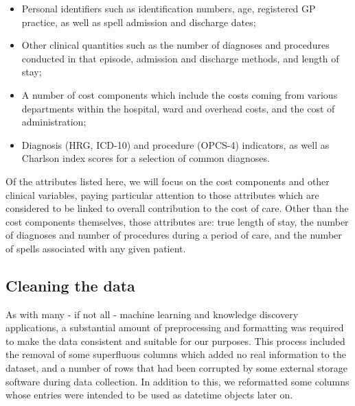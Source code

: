 \begin{itemize}
    \item Personal identifiers such as identification numbers, age, registered
        GP practice, as well as spell admission and discharge dates;
    \item Other clinical quantities such as the number of diagnoses and
        procedures conducted in that episode, admission and discharge methods,
        and length of stay;
    \item A number of cost components which include the costs coming from
        various departments within the hospital, ward and overhead costs, and
        the cost of administration;
    \item Diagnosis (HRG, ICD-10) and procedure (OPCS-4) indicators, as well as
        Charlson index scores for a selection of common diagnoses.
\end{itemize}

Of the attributes listed here, we will focus on the cost components and other
clinical variables, paying particular attention to those attributes which are
considered to be linked to overall contribution to the cost of care. Other than
the cost components themselves, those attributes are: true length of stay,
the number of diagnoses and number of procedures during a period of care, and
the number of spells associated with any given patient.

\subsection{Cleaning the data}\label{subsec:formatting}

As with many \-- if not all \-- machine learning and knowledge discovery
applications, a substantial amount of preprocessing and formatting was required
to make the data consistent and suitable for our purposes. This process included
the removal of some superfluous columns which added no real information to the
dataset, and a number of rows that had been corrupted by some external storage
software during data collection. In addition to this, we reformatted some
columns whose entries were intended to be used as datetime objects later on.
